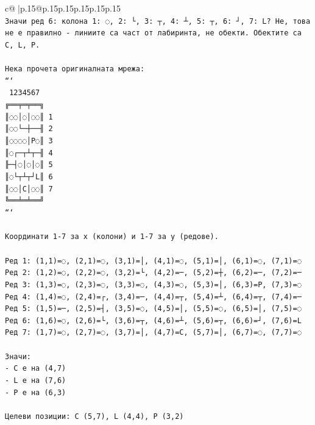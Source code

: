 \documentclass{article}
\begin{document}
{\begin{supertabular}{c@{$\;$}|p{.15\linewidth}@{}p{.15\linewidth}p{.15\linewidth}p{.15\linewidth}p{.15\linewidth}p{.15\linewidth}}
{{{\\ 
\texttt{Значи ред 6: колона 1: ◌, 2: └, 3: ┬, 4: ┴, 5: ┬, 6: ┘, 7: L? Не, това не е правилно {-} линиите са част от лабиринта, не обекти. Обектите са C, L, P.} \\
\\ 
\texttt{Нека прочета оригиналната мрежа:} \\
\texttt{```} \\
\texttt{ 1234567} \\
\texttt{╔══╤═╤══╗} \\
\texttt{║◌◌│◌│◌◌║ 1} \\
\texttt{║◌◌└─┼──╢ 2} \\
\texttt{║◌◌◌◌│P◌║ 3} \\
\texttt{║◌┌─┬┴┬─╢ 4} \\
\texttt{╟─┤◌│◌│◌║ 5} \\
\texttt{║◌└┬┴┬┘L║ 6} \\
\texttt{║◌◌│C│◌◌║ 7} \\
\texttt{╚══╧═╧══╝} \\
\texttt{```} \\
\\ 
\texttt{Координати 1{-}7 за x (колони) и 1{-}7 за y (редове).} \\
\\ 
\texttt{Ред 1: (1,1)=◌, (2,1)=◌, (3,1)=│, (4,1)=◌, (5,1)=│, (6,1)=◌, (7,1)=◌} \\
\texttt{Ред 2: (1,2)=◌, (2,2)=◌, (3,2)=└, (4,2)=─, (5,2)=┼, (6,2)=─, (7,2)=─} \\
\texttt{Ред 3: (1,3)=◌, (2,3)=◌, (3,3)=◌, (4,3)=◌, (5,3)=│, (6,3)=P, (7,3)=◌} \\
\texttt{Ред 4: (1,4)=◌, (2,4)=┌, (3,4)=─, (4,4)=┬, (5,4)=┴, (6,4)=┬, (7,4)=─} \\
\texttt{Ред 5: (1,5)=─, (2,5)=┤, (3,5)=◌, (4,5)=│, (5,5)=◌, (6,5)=│, (7,5)=◌} \\
\texttt{Ред 6: (1,6)=◌, (2,6)=└, (3,6)=┬, (4,6)=┴, (5,6)=┬, (6,6)=┘, (7,6)=L} \\
\texttt{Ред 7: (1,7)=◌, (2,7)=◌, (3,7)=│, (4,7)=C, (5,7)=│, (6,7)=◌, (7,7)=◌} \\
\\ 
\texttt{Значи:} \\
\texttt{{-} C е на (4,7)} \\
\texttt{{-} L е на (7,6)} \\
\texttt{{-} P е на (6,3)} \\
\\ 
\texttt{Целеви позиции: C (5,7), L (4,4), P (3,2)} \\
}}}
\end{supertabular}}
\end{document}
